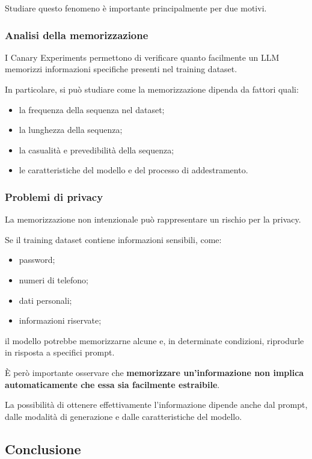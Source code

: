 Studiare questo fenomeno è importante
principalmente per due motivi.

\subsubsection{Analisi della memorizzazione}

I Canary Experiments permettono di verificare
quanto facilmente un LLM memorizzi informazioni
specifiche presenti nel training dataset.

In particolare, si può studiare come
la memorizzazione dipenda da fattori quali:
\begin{itemize}
    \item la frequenza della sequenza nel dataset;
    \item la lunghezza della sequenza;
    \item la casualità e prevedibilità della sequenza;
    \item le caratteristiche del modello
    e del processo di addestramento.
\end{itemize}

\subsubsection{Problemi di privacy}

La memorizzazione non intenzionale può
rappresentare un rischio per la privacy.

Se il training dataset contiene informazioni
sensibili, come:
\begin{itemize}
    \item password;
    \item numeri di telefono;
    \item dati personali;
    \item informazioni riservate;
\end{itemize}

il modello potrebbe memorizzarne alcune
e, in determinate condizioni, riprodurle
in risposta a specifici prompt.

È però importante osservare che
\textbf{memorizzare un'informazione non implica
automaticamente che essa sia facilmente estraibile}.

La possibilità di ottenere effettivamente
l'informazione dipende anche dal prompt,
dalle modalità di generazione
e dalle caratteristiche del modello.

\subsection{Conclusione}

